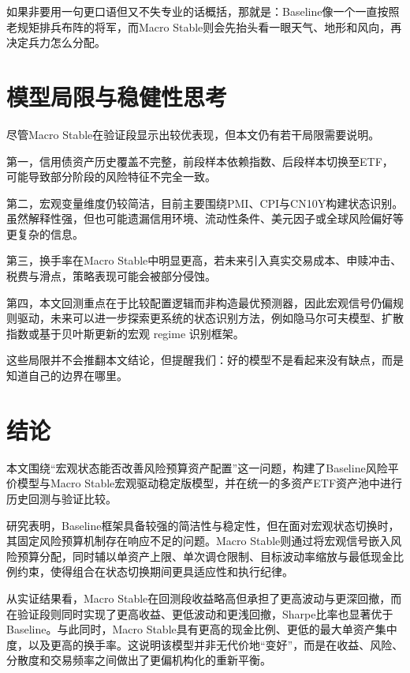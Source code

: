\documentclass[12pt,a4paper]{ctexart}
\begin{document}
如果非要用一句更口语但又不失专业的话概括，那就是：Baseline像一个一直按照老规矩排兵布阵的将军，而Macro Stable则会先抬头看一眼天气、地形和风向，再决定兵力怎么分配。

\section{模型局限与稳健性思考}

尽管Macro Stable在验证段显示出较优表现，但本文仍有若干局限需要说明。

第一，信用债资产历史覆盖不完整，前段样本依赖指数、后段样本切换至ETF，可能导致部分阶段的风险特征不完全一致。

第二，宏观变量维度仍较简洁，目前主要围绕PMI、CPI与CN10Y构建状态识别。虽然解释性强，但也可能遗漏信用环境、流动性条件、美元因子或全球风险偏好等更复杂的信息。

第三，换手率在Macro Stable中明显更高，若未来引入真实交易成本、申赎冲击、税费与滑点，策略表现可能会被部分侵蚀。

第四，本文回测重点在于比较配置逻辑而非构造最优预测器，因此宏观信号仍偏规则驱动，未来可以进一步探索更系统的状态识别方法，例如隐马尔可夫模型、扩散指数或基于贝叶斯更新的宏观 regime 识别框架。

这些局限并不会推翻本文结论，但提醒我们：好的模型不是看起来没有缺点，而是知道自己的边界在哪里。

\section{结论}

本文围绕“宏观状态能否改善风险预算资产配置”这一问题，构建了Baseline风险平价模型与Macro Stable宏观驱动稳定版模型，并在统一的多资产ETF资产池中进行历史回测与验证比较。

研究表明，Baseline框架具备较强的简洁性与稳定性，但在面对宏观状态切换时，其固定风险预算机制存在响应不足的问题。Macro Stable则通过将宏观信号嵌入风险预算分配，同时辅以单资产上限、单次调仓限制、目标波动率缩放与最低现金比例约束，使得组合在状态切换期间更具适应性和执行纪律。

从实证结果看，Macro Stable在回测段收益略高但承担了更高波动与更深回撤，而在验证段则同时实现了更高收益、更低波动和更浅回撤，Sharpe比率也显著优于Baseline。与此同时，Macro Stable具有更高的现金比例、更低的最大单资产集中度，以及更高的换手率。这说明该模型并非无代价地“变好”，而是在收益、风险、分散度和交易频率之间做出了更偏机构化的重新平衡。
\end{document}
